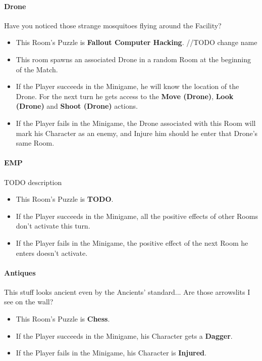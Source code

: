 \paragraph{Drone} Have you noticed those strange mosquitoes flying around the Facility?
\begin{itemize}
	\item This Room's Puzzle is \textbf{Fallout Computer Hacking}. //TODO change name
	\item This room spawns an associated Drone in a random Room at the beginning of the Match.
	\item If the Player succeeds in the Minigame, he will know the location of the Drone. For the next turn he gets access to the \textbf{Move (Drone)}, \textbf{Look (Drone)} and \textbf{Shoot (Drone)} actions.
	\item If the Player fails    in the Minigame, the Drone associated with this Room will mark his Character as an enemy, and Injure him should he enter that Drone's same Room.
\end{itemize}

\paragraph{EMP} TODO description
\begin{itemize}
	\item This Room's Puzzle is \textbf{TODO}.
	\item If the Player succeeds in the Minigame, all the positive effects of other Rooms don't activate this turn.
	\item If the Player fails    in the Minigame, the positive effect of the next Room he enters doesn't activate.
\end{itemize}

\paragraph{Antiques} This stuff looks ancient even by the Ancients' standard... Are those arrowslits I see on the wall?
\begin{itemize}
	\item This Room's Puzzle is \textbf{Chess}.
	\item If the Player succeeds in the Minigame, his Character gets a \textbf{Dagger}.
	\item If the Player fails    in the Minigame, his Character is \textbf{Injured}.
\end{itemize}


